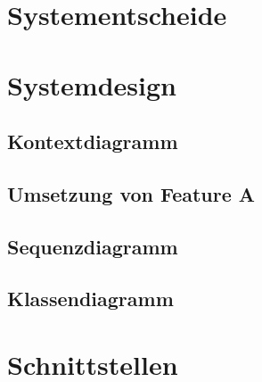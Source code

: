 \section{Systementscheide}

\section{Systemdesign}
    \subsection{Kontextdiagramm}
    \subsection{Umsetzung von Feature A}
    \subsection{Sequenzdiagramm}
    \subsection{Klassendiagramm}

\section{Schnittstellen}